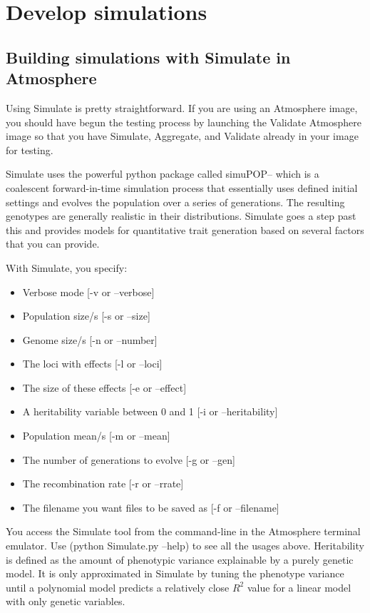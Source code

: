 \documentclass[twoside,a4paper]{refart}
\begin{document}
\section{Develop simulations}


\subsection{Building simulations with Simulate in Atmosphere}

Using Simulate is pretty straightforward. If you are using an Atmosphere image, you should have begun the testing process by launching the Validate Atmosphere image so that you have Simulate, Aggregate, and Validate already in your image for testing.

Simulate uses the powerful python package called simuPOP-- which is a coalescent forward-in-time simulation process that essentially uses defined initial settings and evolves the population over a series of generations. The resulting genotypes are generally realistic in their distributions. Simulate goes a step past this and provides models for quantitative trait generation based on several factors that you can provide. 

With Simulate, you specify:
\begin{itemize}
\item Verbose mode [-v or --verbose]
\item Population size/s [-s or --size]
\item Genome size/s [-n or --number]
\item The loci with effects [-l or --loci]
\item The size of these effects [-e or --effect]
\item A heritability variable between 0 and 1 [-i or --heritability]
\item Population mean/s [-m or --mean]
\item The number of generations to evolve [-g or --gen]
\item The recombination rate [-r or --rrate]
\item The filename you want files to be saved as [-f or --filename]
\end{itemize}

You access the Simulate tool from the command-line in the Atmosphere terminal emulator. Use (python Simulate.py --help) to see all the usages above. Heritability is defined as the amount of phenotypic variance explainable by a purely genetic model. It is only approximated in Simulate by tuning the phenotype variance until a polynomial model predicts a relatively close $R^2$ value for a linear model with only genetic variables.
\end{document}
